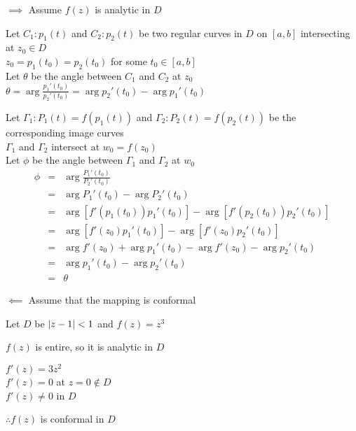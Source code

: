\documentclass[letterpaper,12pt,fleqn]{article}
\renewcommand{\o}{\theta}
\newcommand{\p}{\phi}
\newcommand{\G}{\Gamma}
\begin{document}
\begin{theproof}
  \listbreak
  \begin{description}
  \item $\implies$ Assume $f(z)$ is analytic in $D$

    Let $C_1: p_1(t)$ and $C_2: p_2(t)$ be two regular curves in $D$ on
    $[a,b]$ intersecting at $z_0\in D$ \\
    $z_0=p_1(t_0)=p_2(t_0)$ for some $t_0\in[a,b]$ \\
    Let $\o$ be the angle between $C_1$ and $C_2$ at $z_0$ \\
    $\o=\arg{\frac{{p_1}'(t_0)}{{p_2}'(t_0)}}=
    \arg{{p_2}'(t_0)}-\arg{{p_1}'(t_0)}$

    Let $\G_1: P_1(t)=f(p_1(t))$ and $\G_2: P_2(t)=f(p_2(t))$ be the
    corresponding image curves \\
    $\G_1$ and $\G_2$ intersect at $w_0=f(z_0)$ \\
    Let $\p$ be the angle between $\G_1$ and $\G_2$ at $w_0$
    \begin{eqnarray*}
      \p &=& \arg{\frac{{P_1}'(t_0)}{{P_2}'(t_0)}} \\
      &=& \arg{{P_1}'(t_0)}-\arg{{P_2}'(t_0)} \\
      &=& \arg[f'(p_1(t_0)){p_1}'(t_0)]-\arg[f'(p_2(t_0)){p_2}'(t_0)] \\
      &=& \arg[f'(z_0){p_1}'(t_0)]-\arg[f'(z_0){p_2}'(t_0)] \\
      &=& \arg{f'(z_0)}+\arg{{p_1}'(t_0)}-\arg{f'(z_0)}-\arg{{p_2}'(t_0)} \\
      &=& \arg{{p_1}'(t_0)}-\arg{{p_2}'(t_0)} \\
      &=& \o
    \end{eqnarray*}
    
  \item $\impliedby$ Assume that the mapping is conformal
    
  \end{description}
\end{theproof}
\newpage
\begin{example}
  Let $D$ be $\lvert z-1\rvert<1$ and $f(z)=z^3$

  $f(z)$ is entire, so it is analytic in $D$

  $f'(z)=3z^2$ \\
  $f'(z)=0$ at $z=0\notin D$ \\
  $f'(z)\ne 0$ in $D$

  $\therefore f(z)$ is conformal in $D$
\end{example}
\end{document}

